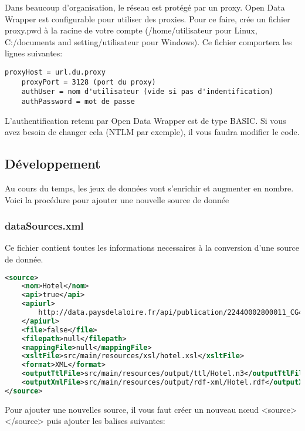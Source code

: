 \documentclass[a4paper]{article}
\begin{document}
Dans beaucoup d'organisation, le réseau est protégé par un proxy. Open Data
Wrapper est configurable pour utiliser des proxies. Pour ce faire, crée un
fichier proxy.pwd à la racine de votre compte (/home/utilisateur pour Linux,
C:/documents and setting/utilisateur pour Windows). Ce fichier comportera les
lignes suivantes:

\begin{lstlisting}[caption=Fichier de configuration des proxys proxy.pwd]
	proxyHost = url.du.proxy
	proxyPort = 3128 (port du proxy)
	authUser = nom d'utilisateur (vide si pas d'indentification)
	authPassword = mot de passe
\end{lstlisting}

L'authentification retenu par Open Data Wrapper est de type BASIC. Si vous avez
besoin de changer cela (NTLM par exemple), il vous faudra modifier le code.

\subsection{Développement}

Au cours du temps, les jeux de données vont s'enrichir et augmenter en nombre.
Voici la procédure pour ajouter une nouvelle source de donnée

\subsubsection{dataSources.xml}

Ce fichier contient toutes les informations necessaires à la conversion d'une
source de donnée.

\begin{lstlisting}[caption=Extrait de dataSources.xml, language=XML]
<source>
	<nom>Hotel</nom>
	<api>true</api>
	<apiurl>
		http://data.paysdelaloire.fr/api/publication/22440002800011_CG44_TOU_04815/hotels_STBL/content?format=xml
	</apiurl>
	<file>false</file>
	<filepath>null</filepath>
	<mappingFile>null</mappingFile>
	<xsltFile>src/main/resources/xsl/hotel.xsl</xsltFile>
	<format>XML</format>
	<outputTtlFile>src/main/resources/output/ttl/Hotel.n3</outputTtlFile>
	<outputXmlFile>src/main/resources/output/rdf-xml/Hotel.rdf</outputXmlFile>
</source>
\end{lstlisting}

Pour ajouter une nouvelles source, il vous faut créer un nouveau n\oe{}ud
<source></source> puis ajouter les balises suivantes:
\\
\end{document}
